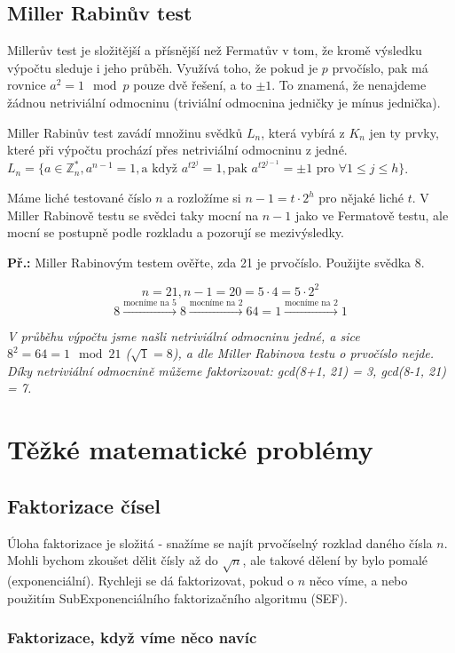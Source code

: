 \documentclass[10pt,a4paper]{article}
\begin{document}
\subsection{Miller Rabinův test}
Millerův test je složitější a přísnější než Fermatův v tom, že kromě výsledku výpočtu sleduje i jeho průběh. Využívá toho, že pokud je $p$ prvočíslo, pak má rovnice $a^2 = 1 \mod p$ pouze dvě řešení, a to $\pm 1$. To znamená, že nenajdeme žádnou netriviální odmocninu (triviální odmocnina jedničky je mínus jednička).

Miller Rabinův test zavádí množinu svědků $L_n$, která vybírá z $K_n$ jen ty prvky, které při výpočtu prochází přes netriviální odmocninu z jedné. $L_n = \{ a \in \mathbb{Z}_n^*, a^{n-1} = 1, \text{a když } a^{t2^j} = 1, \text{pak } a^{t2^{j-1}} = \pm 1 \text{ pro } \forall 1 \leq j \leq h \}$.

Máme liché testované číslo $n$ a rozložíme si $n-1 = t \cdot 2^h$ pro nějaké liché $t$. V Miller Rabinově testu se svědci taky mocní na $n-1$ jako ve Fermatově testu, ale mocní se postupně podle rozkladu a pozorují se mezivýsledky.

\textbf{Př.:} Miller Rabinovým testem ověřte, zda 21 je prvočíslo. Použijte svědka 8.

$$n = 21, n-1 = 20 = 5 \cdot 4  = 5 \cdot 2^2$$
$$ 8 \xrightarrow{\text{mocníme na 5}} 8 \xrightarrow{\text{mocníme na 2}} 64 = 1 \xrightarrow{\text{mocníme na 2}} 1$$

\textit{V průběhu výpočtu jsme našli netriviální odmocninu jedné, a sice $8^2 = 64 = 1 \mod 21$ ($\sqrt{1} = 8$), a dle Miller Rabinova testu o prvočíslo nejde. Díky netriviální odmocnině můžeme faktorizovat: gcd(8+1, 21) = 3, gcd(8-1, 21) = 7.}



\section{Těžké matematické problémy}
\subsection{Faktorizace čísel}
Úloha faktorizace je složitá - snažíme se najít prvočíselný rozklad daného čísla $n$. Mohli bychom zkoušet dělit čísly až do $\sqrt{n}$, ale takové dělení by bylo pomalé (exponenciální). Rychleji se dá faktorizovat, pokud o $n$ něco víme, a nebo použitím SubExponenciálního faktorizačního algoritmu (SEF).

\subsubsection{Faktorizace, když víme něco navíc}
\end{document}
